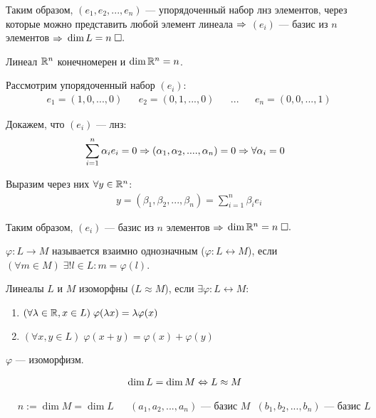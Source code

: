 \documentclass{article}
\begin{document}
Таким образом, $(e_1,e_2,...,e_{n})$ --- упорядоченный набор лнз элементов, через которые можно представить
любой элемент линеала $\Rarr$ $(e_{i})$ --- базис из $n$ элементов $\Rarr$ $\dim L=n\qed$

\pagebreak

\theorem

Линеал $\R^{n}$ конечномерен и $\dim\R^{n}=n$.

\proof

Рассмотрим упорядоченный набор $(e_{i})$:
\begin{align*}
	 & e_1=(1,0,...,0) &  & e_2=(0,1,...,0) &  & ... &  & e_{n}=(0,0,...,1)
\end{align*}

Докажем, что $(e_{i})$ --- лнз:
\begin{align*}
	\sum_{i=1}^{n}\alpha_{i}e_{i}=0\Rarr(\alpha_1,\alpha_2,....,\alpha_{n})=0\Rarr\forall\alpha_{i}=0
\end{align*}

Выразим через них $\forall y\in\R^{n}$:
\begin{align*}
	 & y=(\beta_1,\beta_2,...,\beta_{n})=\sum_{i=1}^{n}\beta_{i}e_{i}
\end{align*}

Таким образом, $(e_{i})$ --- базис из $n$ элементов $\Rarr$ $\dim\R^{n}=n\qed$


$\varphi:L\to M$ называется взаимно однозначным ($\varphi:L\leftrightarrow M$), если $(\forall m\in M)\;\exists!l\in L:m=\varphi(l)$.


Линеалы $L$ и $M$ изоморфны ($L\approx M$), если $\exists\varphi:L\leftrightarrow M$:
\begin{enumerate}
	\item{}$(\forall \lambda\in\R,x\in L)\;\varphi(\lambda x)=\lambda\varphi(x)$
	\item{}$(\forall x,y\in L)\;\varphi(x+y)=\varphi(x)+\varphi(y)$
\end{enumerate}

$\varphi$ --- изоморфизм.

\theorem
\begin{align*}
	\dim L=\dim M\Lrarr L\approx M
\end{align*}

\onlyif
\begin{align*}
	 & n:=\dim M=\dim L &  & (a_1,a_2,...,a_{n})\text{ --- базис $M$} &  & (b_1,b_2,...,b_{n})\text{ --- базис $L$}
\end{align*}
\end{document}
